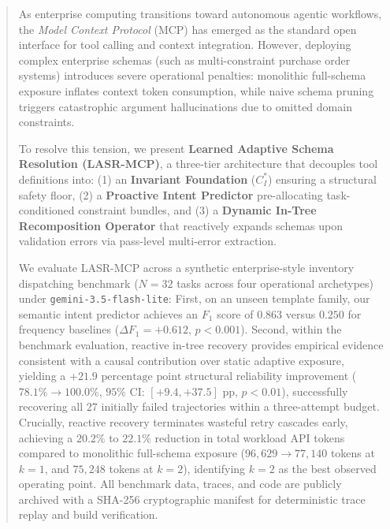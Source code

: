 \begin{abstract}
As enterprise computing transitions toward autonomous agentic workflows, the \textit{Model Context Protocol} (MCP) has emerged as the standard open interface for tool calling and context integration. 
However, deploying complex enterprise schemas (such as multi-constraint purchase order systems) introduces severe operational penalties: monolithic full-schema exposure inflates context token consumption, while naive schema pruning triggers catastrophic argument hallucinations due to omitted domain constraints.

To resolve this tension, we present \textbf{Learned Adaptive Schema Resolution (LASR-MCP)}, a three-tier architecture that decouples tool definitions into: 
(1) an \textbf{Invariant Foundation} ($C_I^*$) ensuring a structural safety floor, 
(2) a \textbf{Proactive Intent Predictor} pre-allocating task-conditioned constraint bundles, and 
(3) a \textbf{Dynamic In-Tree Recomposition Operator} that reactively expands schemas upon validation errors via pass-level multi-error extraction.

We evaluate LASR-MCP across a synthetic enterprise-style inventory dispatching benchmark ($N=32$ tasks across four operational archetypes) under \texttt{gemini-3.5-flash-lite}:
First, on an unseen template family, our semantic intent predictor achieves an $F_1$ score of $0.863$ versus $0.250$ for frequency baselines ($\Delta F_1 = +0.612$, $p < 0.001$).
Second, within the benchmark evaluation, reactive in-tree recovery provides empirical evidence consistent with a causal contribution over static adaptive exposure, yielding a $+21.9\text{ percentage point}$ structural reliability improvement ($78.1\% \rightarrow 100.0\%$, $95\%\text{ CI: } [+9.4, +37.5]\text{ pp}$, $p < 0.01$), successfully recovering all $27$ initially failed trajectories within a three-attempt budget.
Crucially, reactive recovery terminates wasteful retry cascades early, achieving a $20.2\%$ to $22.1\%$ reduction in total workload API tokens compared to monolithic full-schema exposure ($96,629 \rightarrow 77,140$ tokens at $k=1$, and $75,248$ tokens at $k=2$), identifying $k=2$ as the best observed operating point.
All benchmark data, traces, and code are publicly archived with a SHA-256 cryptographic manifest for deterministic trace replay and build verification.
\end{abstract}
